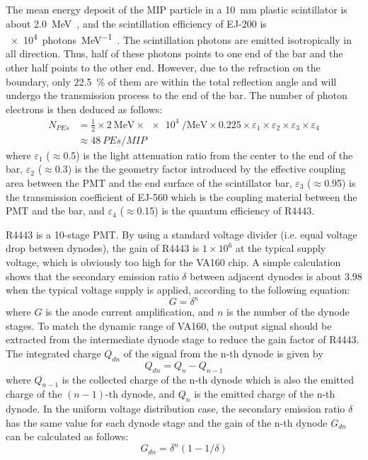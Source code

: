 \documentclass[preprint, times]{elsarticle}
\begin{document}
The mean energy deposit of the MIP particle in a \SI{10}{\milli\meter} plastic scintillator is about \SI{2.0}{\mega\electronvolt}~\cite{olive_review_2014}, and the scintillation efficiency of EJ-200 is \SI[per-mode=symbol]{e4}{photons\per\mega\electronvolt}~\cite{scintillator}.
The scintillation photons are emitted isotropically in all direction.
Thus, half of these photons points to one end of the bar and the other half points to the other end.
However, due to the refraction on the boundary, only \SI{22.5}{\percent} of them are within the total reflection angle and will undergo the transmission process to the end of the bar.
The number of photon electrons is then deduced as follows:
\begin{align}
 N_{PEs} &= \frac{1}{2} \times \SI[per-mode=symbol]{2}{\mega\electronvolt} \times \SI{e4}{\per\mega\electronvolt} \times 0.225
           \times \varepsilon_{1} \times \varepsilon_{2} \times \varepsilon_{3} \times \varepsilon_{4} \nonumber \\
         &\approx \SI{48}{PEs\per{MIP}}
\label{eq:pes}
\end{align}
where $\varepsilon_1$ ($\approx$0.5) is the light attenuation ratio from the center to the end of the bar,
$\varepsilon_2$ ($\approx$0.3) is the the geometry factor introduced by the effective coupling area between the PMT and the end surface of the scintillator bar,
$\varepsilon_3$ ($\approx$0.95) is the transmission coefficient of EJ-560 which is the coupling material between the PMT and the bar,
and $\varepsilon_4$ ($\approx$0.15) is the quantum efficiency of R4443.

R4443 is a 10-stage PMT. 
By using a standard voltage divider (i.e. equal voltage drop between dynodes), the gain of R4443 is $1\times10^6$ at the typical supply voltage, which is obviously too high for the VA160 chip. 
A simple calculation shows that the secondary emission ratio $\delta$ between adjacent dynodes is about 3.98 when the typical voltage supply is applied,  according to the following equation:
\begin{equation}
G=\delta^{n}
\label{eq:gain}
\end{equation}
where $G$ is the anode current amplification, and $n$ is the number of the dynode stages. 
To match the dynamic range of VA160, the output signal should be extracted from the intermediate dynode stage to reduce the gain factor of R4443. 
The integrated charge $Q_{dn}$ of the signal from the n-th dynode is given by
\begin{equation}
Q_{dn}=Q_{n}-Q_{n-1}
\label{eq:dycharge}
\end{equation}
where $Q_{n-1}$ is the collected charge of the n-th dynode which is also the emitted charge of the $(n-1)$-th dynode, and $Q_{n}$ is the emitted charge of the n-th dynode. 
In the uniform voltage distribution case, the secondary emission ratio $\delta$ has the same value for each dynode stage and the gain of the n-th dynode $G_{dn}$ can be calculated as follows:
\begin{equation}
G_{dn}=\delta^{n}(1-1/\delta)
\label{eq:dygain}
\end{equation}
\end{document}
